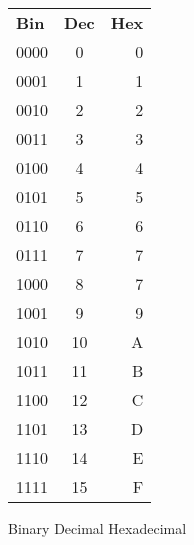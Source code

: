 \documentclass{article}
\begin{document}
\begin{table}[h!]
	\begin{center}
		\begin{tabular}{l|c|r}
			\textbf{Bin} & \textbf{Dec} & \textbf{Hex} \\
			0000 & 0 & 0 \\
			0001 & 1 & 1 \\
			0010 & 2 & 2 \\
			0011 & 3 & 3 \\
			0100 & 4 & 4 \\
			0101 & 5 & 5 \\
			0110 & 6 & 6 \\
			0111 & 7 & 7 \\
			1000 & 8 & 7 \\
			1001 & 9 & 9 \\
			1010 & 10 & A \\
			1011 & 11 & B \\
			1100 & 12 & C \\
			1101 & 13 & D \\
			1110 & 14 & E \\
			1111 & 15 & F \\
		\end{tabular}
	\end{center}
\end{table}


Binary Decimal Hexadecimal
\end{document}
